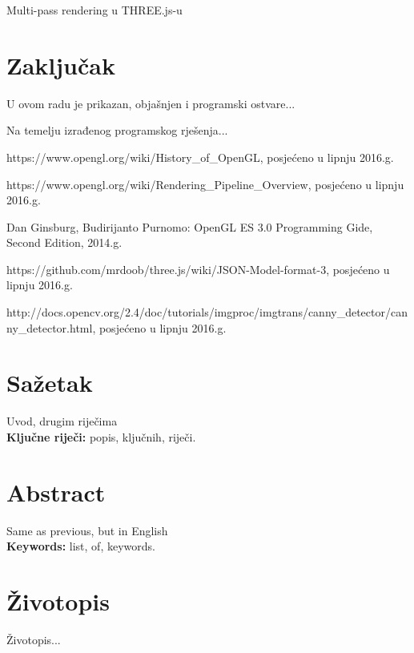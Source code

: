\documentclass[a4paper,12pt]{extarticle}
\begin{document}
Multi-pass rendering u THREE.js-u


\section{Zaključak}

U ovom radu je prikazan, objašnjen i programski ostvare...


Na temelju izrađenog programskog rješenja...

\begin{thebibliography}{9}

	https://www.opengl.org/wiki/History\_of\_OpenGL, posjećeno u lipnju 2016.g.

	https://www.opengl.org/wiki/Rendering\_Pipeline\_Overview, posjećeno u lipnju 2016.g.
	
	Dan Ginsburg, Budirijanto Purnomo: OpenGL ES 3.0 Programming Gide, Second Edition, 2014.g.

	https://github.com/mrdoob/three.js/wiki/JSON-Model-format-3, posjećeno u lipnju 2016.g.

	http://docs.opencv.org/2.4/doc/tutorials/imgproc/imgtrans/canny\_detector/canny\_detector.html, posjećeno u lipnju 2016.g.

\end{thebibliography}

\section*{Sažetak}

Uvod, drugim riječima\\


{\bfseries Ključne riječi:} popis, ključnih, riječi.

\section*{Abstract}

Same as previous, but in English\\


{\bfseries Keywords:} list, of, keywords.

\section*{Životopis}

Životopis... %
\end{document}
